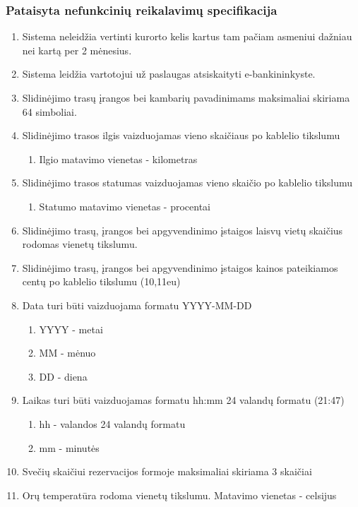 \documentclass[oneside]{VUMIFPSkursinis}
\begin{document}
\subsubsection{Pataisyta nefunkcinių reikalavimų specifikacija}
\begin{enumerate}

	
	\item Sistema neleidžia vertinti kurorto kelis kartus tam pačiam asmeniui dažniau nei kartą per 2 mėnesius.
	\item Sistema leidžia vartotojui už paslaugas atsiskaityti e-bankininkyste.
	\item Slidinėjimo trasų įrangos bei kambarių pavadinimams maksimaliai skiriama 64 simboliai.
	\item Slidinėjimo trasos ilgis vaizduojamas vieno skaičiaus po kablelio tikslumu
	\begin{enumerate}
		\item Ilgio matavimo vienetas - kilometras
	\end{enumerate}
	\item Slidinėjimo trasos statumas vaizduojamas vieno skaičio po kablelio tikslumu
	\begin{enumerate}
		\item Statumo matavimo vienetas - procentai
	\end{enumerate}
	\item Slidinėjimo trasų, įrangos bei apgyvendinimo įstaigos laisvų vietų skaičius rodomas vienetų tikslumu.
	\item Slidinėjimo trasų, įrangos bei apgyvendinimo įstaigos kainos pateikiamos centų po kablelio tikslumu (10,11eu)
	\item Data turi būti vaizduojama formatu YYYY-MM-DD
	\begin{enumerate}
		\item YYYY - metai
		\item MM - mėnuo
		\item DD - diena
	\end{enumerate}
	\item Laikas turi būti vaizduojamas formatu hh:mm 24 valandų formatu (21:47)
	\begin{enumerate}
		\item hh - valandos 24 valandų formatu
		\item mm - minutės
	\end{enumerate}
	\item Svečių skaičiui rezervacijos formoje maksimaliai skiriama 3 skaičiai
	\item Orų temperatūra rodoma vienetų tikslumu. Matavimo vienetas - celsijus

\end{enumerate}
\end{document}
